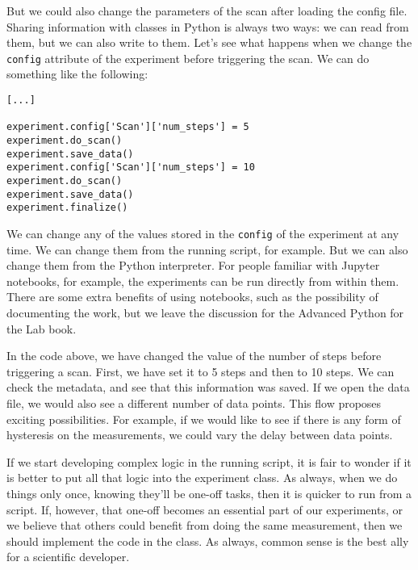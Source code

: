 But we could also change the parameters of the scan after loading the config file. Sharing information with classes in Python is always two ways: we can read from them, but we can also write to them. Let's see what happens when we change the \texttt{config} attribute of the experiment before triggering the scan. We can do something like the following:

\begin{verbatim}
[...]

experiment.config['Scan']['num_steps'] = 5
experiment.do_scan()
experiment.save_data()
experiment.config['Scan']['num_steps'] = 10
experiment.do_scan()
experiment.save_data()
experiment.finalize()
\end{verbatim}

We can change any of the values stored in the \texttt{config} of the experiment at any time. We can change them from the running script, for example. But we can also change them from the Python interpreter. For people familiar with Jupyter notebooks, for example, the experiments can be run directly from within them. There are some extra benefits of using notebooks, such as the possibility of documenting the work, but we leave the discussion for the Advanced Python for the Lab book.


In the code above, we have changed the value of the number of steps before triggering a scan. First, we have set it to 5 steps and then to 10 steps. We can check the metadata, and see that this information was saved. If we open the data file, we would also see a different number of data points. This flow proposes exciting possibilities. For example, if we would like to see if there is any form of hysteresis on the measurements, we could vary the delay between data points.


If we start developing complex logic in the running script, it is fair to wonder if it is better to put all that logic into the experiment class. As always, when we do things only once, knowing they'll be one-off tasks, then it is quicker to run from a script. If, however, that one-off becomes an essential part of our experiments, or we believe that others could benefit from doing the same measurement, then we should implement the code in the class. As always, common sense is the best ally for a scientific developer.

